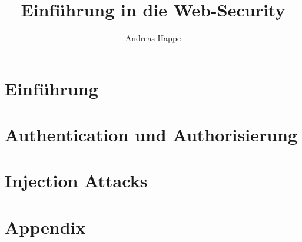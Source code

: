\documentclass[letterpaper]{kdp}
\title{Einführung in die Web-Security}
\author{Andreas Happe}
\begin{document}

\tableofcontents %

\cleardoublepage %



\mainmatter

\part{Einführung}











\part{Authentication und Authorisierung}









\part{Injection Attacks}







\appendix

\part{Appendix}





\printindex
\end{document}
